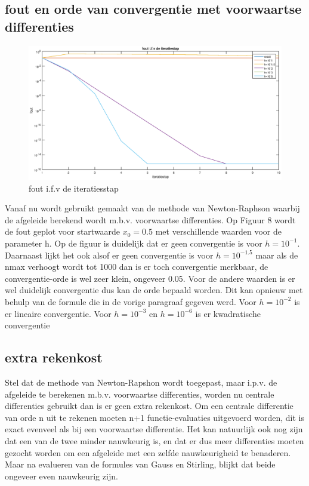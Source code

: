 \documentclass{article}
\begin{document}
\subsection{fout en orde van convergentie met voorwaartse differenties}
\begin{center}
\begin{figure}[h!]
\includegraphics[width=0.75\columnwidth]{figuur_4}
\caption{fout i.f.v de iteratiesstap} %
\end{figure}
\end{center}
Vanaf nu wordt gebruikt gemaakt van de methode van Newton-Raphson waarbij de afgeleide berekend wordt m.b.v. voorwaartse differenties. Op Figuur 8 wordt de fout geplot voor startwaarde $x_{0}=0.5$ met verschillende waarden voor de parameter h. Op de figuur is duidelijk dat er geen convergentie is  voor $h=10^{-1}$. Daarnaast lijkt het ook alsof er geen convergentie is voor $h=10^{-1.5}$ maar als de nmax verhoogt wordt tot 1000 dan is er toch convergentie merkbaar, de convergentie-orde is wel zeer klein, ongeveer 0.05.  Voor de andere waarden is er wel duidelijk convergentie dus kan de orde bepaald worden. Dit kan opnieuw met behulp van de formule die in de vorige paragraaf gegeven werd. Voor $h=10^{-2}$ is er lineaire convergentie. Voor $h=10^{-3}$ en $h=10^{-6}$ is er kwadratische convergentie
\subsection{extra rekenkost}
Stel dat de methode van Newton-Rapshon wordt toegepast, maar i.p.v. de afgeleide te berekenen m.b.v. voorwaartse differenties, worden nu centrale differenties gebruikt dan is er geen extra rekenkost. Om een centrale differentie van orde n uit te rekenen moeten n+1 functie-evaluaties uitgevoerd worden, dit is exact evenveel als bij een voorwaartse differentie. Het kan natuurlijk ook nog zijn dat een van de twee minder nauwkeurig is, en dat er dus meer differenties moeten gezocht worden om een afgeleide met een zelfde nauwkeurigheid te benaderen. Maar na evalueren van de formules van Gauss en Stirling, blijkt dat beide ongeveer even nauwkeurig zijn.




\clearpage

\end{document}
